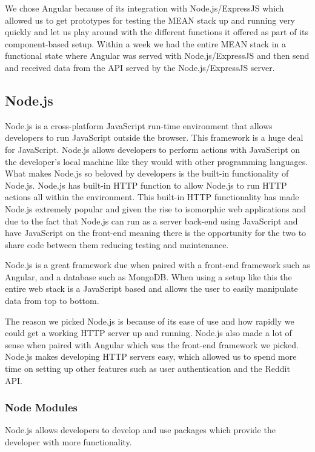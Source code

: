 We chose Angular because of its integration with Node.js/ExpressJS which allowed us to get prototypes for testing the MEAN stack up and running very quickly and let us play around with the different functions it offered as part of its component-based setup. Within a week we had the entire MEAN stack in a functional state where Angular was served with Node.js/ExpressJS and then send and received data from the API served by the Node.js/ExpressJS server.

\subsection{Node.js}
Node.js is a cross-platform JavaScript run-time environment that allows developers to run JavaScript outside the browser. This framework is a huge deal for JavaScript. Node.js allows developers to perform actions with JavaScript on the developer's local machine like they would with other programming languages. What makes Node.js so beloved by developers is the built-in functionality of Node.js. Node.js has built-in HTTP function to allow Node.js to run HTTP actions all within the environment. This built-in HTTP functionality has made Node.js extremely popular and given the rise to isomorphic web applications and due to the fact that Node.js can run as a server back-end using JavaScript and have JavaScript on the front-end meaning there is the opportunity for the two to share code between them reducing testing and maintenance.

Node.js is a great framework due when paired with a front-end framework such as Angular, and a database such as MongoDB. When using a setup like this the entire web stack is a JavaScript based and allows the user to easily manipulate data from top to bottom.

The reason we picked Node.js is because of its ease of use and how rapidly we could get a working HTTP server up and running. Node.js also made a lot of sense when paired with Angular which was the front-end framework we picked. Node.js makes developing HTTP servers easy, which allowed us to spend more time on setting up other features such as user authentication and the Reddit API. 

\subsubsection{Node Modules}
Node.js allows developers to develop and use packages which provide the developer with more functionality.

